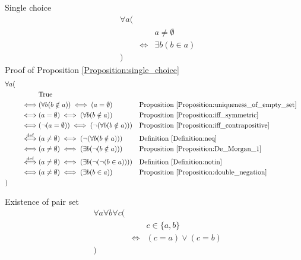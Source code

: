 \begin{prop}
\label{Proposition:single_choice}
Single choice
\begin{align*}
& \forall a ( \\
& & & a \neq \emptyset \\
& & \iff & \exists b (b \in a) \\
& )
\end{align*}
Proof of Proposition \ref{Proposition:single_choice}
\begin{align*}
& \forall a ( \\
& & & \text{True} \\
& & \iff & (\forall b (b \notin a)) \iff (a = \emptyset)
&& \text{Proposition \ref{Proposition:uniqueness_of_empty_set}} \\
& & \iff & (a = \emptyset) \iff (\forall b (b \notin a))
&& \text{Proposition \ref{Proposition:iff_symmetric}} \\
& & \iff & (\lnot (a = \emptyset)) \iff (\lnot (\forall b (b \notin a)))
&& \text{Proposition \ref{Proposition:iff_contrapositive}} \\
& & \overset{\operatorname{def}}{\iff} & (a \neq \emptyset) \iff (\lnot (\forall b (b \notin a)))
&& \text{Definition \ref{Definition:neq}} \\
& & \iff & (a \neq \emptyset) \iff (\exists b (\lnot (b \notin a)))
&& \text{Proposition \ref{Proposition:De_Morgan_1}} \\
& & \overset{\operatorname{def}}{\iff} & (a \neq \emptyset) \iff (\exists b (\lnot (\lnot (b \in a))))
&& \text{Definition \ref{Definition:notin}} \\
& & \iff & (a \neq \emptyset) \iff (\exists b (b \in a))
&& \text{Proposition \ref{Proposition:double_negation}} \\
& )
\end{align*}
\end{prop}

\begin{axm}
\label{Axiom:existence_of_pair_set}
Existence of pair set
\begin{align*}
& \forall a \forall b \forall c ( \\
& & & c \in \{ a , b \} \\
& & \iff & (c = a) \lor (c = b) \\
& )
\end{align*}
\end{axm}

